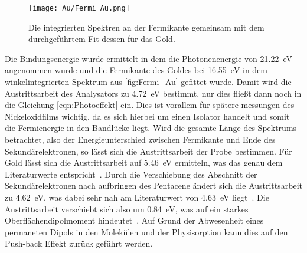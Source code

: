         \begin{figure}
            \centering
            \texttt{[image: Au/Fermi\_Au.png]}
            \caption{Die integrierten Spektren an der Fermikante gemeinsam mit dem durchgeführtem Fit dessen für das Gold.}
            \label{fig:Fermi_Au}
        \end{figure}
        Die Bindungsenergie wurde ermittelt in dem die Photonenenergie von \SI{21.22}{\electronvolt} angenommen wurde und die Fermikante des Goldes bei \SI{16.55}{\electronvolt} in dem winkelintegrierten Spektrum aus \autoref{fig:Fermi_Au} gefittet wurde.
        Damit wird die Austrittsarbeit des Analysators zu \SI{4.72}{\electronvolt} bestimmt, nur dies fließt dann noch in die Gleichung \ref{eqn:Photoeffekt} ein.
        Dies ist vorallem für spätere messungen des Nickeloxidfilms wichtig, da es sich hierbei um einen Isolator handelt und somit die Fermienergie in den Bandlücke liegt.
        Wird die gesamte Länge des Spektrums betrachtet, also der Energieunterschied zwischen Fermikante und Ende des Sekundärelektronen, so lässt sich die Austrittsarbeit der Probe bestimmen.
        Für Gold lässt sich die Austrittsarbeit auf \SI{5.46}{\electronvolt} ermitteln, was das genau dem Literaturwerte entspricht~\cite{5A_4}.
        Durch die Verschiebung des Abschnitt der Sekundärelektronen nach aufbringen des Pentacene ändert sich die Austrittsarbeit zu \SI{4.62}{\electronvolt}, was dabei sehr nah am Literaturwert von \SI{4.63}{\electronvolt} liegt~\cite{5A_4}.
        Die Austrittsarbeit verschiebt sich also um \SI{0.84}{\electronvolt}, was auf ein starkes Oberflächendipolmoment hindeutet~\cite{5A_3}.
        Auf Grund der Abwesenheit eines permaneten Dipols in den Molekülen und der Physisorption kann dies auf den Push-back Effekt zurück geführt werden.

        
